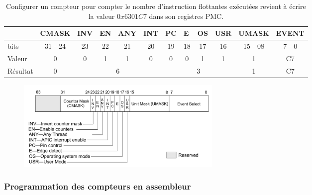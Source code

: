        
        \begin{table}[]
        \centering
        \begin{tabular}{l|c|c|c|c|c|c|c|c|c|c|c|}
        \cline{2-12}
        & \multicolumn{1}{l|}{CMASK} & \multicolumn{1}{l|}{INV} & \multicolumn{1}{l|}{EN} & \multicolumn{1}{l|}{ANY} & \multicolumn{1}{l|}{INT} & \multicolumn{1}{l|}{PC} & \multicolumn{1}{l|}{E} & \multicolumn{1}{l|}{OS} & \multicolumn{1}{l|}{USR} & \multicolumn{1}{l|}{UMASK} & \multicolumn{1}{l|}{EVENT} \\ \hline
        \multicolumn{1}{|l|}{bits} & 31 - 24 & 23 & 22 & 21 & 20 & 19 & 18 & 17 & 16 & 15 - 08 & 7 - 0 \\ \hline
        \multicolumn{1}{|l|}{Valeur} & 0 & 0 & 1 & 1 & 0 & 0 & 0 & 1 & 1 & 1 & C7 \\ \hline
        \multicolumn{1}{|l|}{Résultat} & 0 & \multicolumn{4}{c|}{6} & \multicolumn{4}{c|}{3} & 1 & C7 \\ \hline
        \end{tabular}%
        \caption{Configurer un compteur pour compter le nombre d'instruction flottantes exécutées revient à écrire la valeur $0x6301C7$ dans son registres PMC.}
        \label{tab:pmc_config}
        \end{table}
        
        \begin{figure}
        \center
        \includegraphics[width=10cm]{images/eld_perf_pmc.png}
        \caption{\label{pic:eld_perf_pmc}}
        \end{figure}

        
        
               
    \subsubsection{Programmation des compteurs en assembleur} \label{sec:perf_asm_msr}
    
